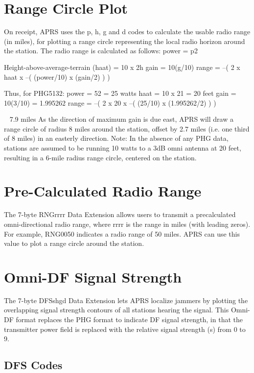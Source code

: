 \section{Range Circle Plot}

On receipt, APRS uses the p, h, g and d codes to calculate the usable radio
range (in miles), for plotting a range circle representing the local radio
horizon around the station. The radio range is calculated as follows:
power = p2

Height-above-average-terrain (haat) = 10 x 2h
gain = 10(g/10)
range = –( 2 x haat x –( (power/10) x (gain/2) ) )

Thus, for PHG5132:
power = 52 = 25 watts
haat = 10 x 21 = 20 feet
gain = 10(3/10) = 1.995262
range = –( 2 x 20 x –( (25/10) x (1.995262/2) ) )

~ 7.9 miles
As the direction of maximum gain is due east, APRS will draw a range circle
of radius 8 miles around the station, offset by 2.7 miles (i.e. one third of 8
miles) in an easterly direction.
Note: In the absence of any PHG data, stations are assumed to be running 10
watts to a 3dB omni antenna at 20 feet, resulting in a 6-mile radius range
circle, centered on the station.

\section {Pre-Calculated Radio Range}

The 7-byte RNGrrrr Data Extension allows users to transmit a precalculated omni-directional radio range, where rrrr is the range in miles
(with leading zeros).
For example, RNG0050 indicates a radio range of 50 miles.
APRS can use this value to plot a range circle around the station.

\section{Omni-DF Signal Strength}

The 7-byte DFSshgd Data Extension lets APRS localize jammers by plotting
the overlapping signal strength contours of all stations hearing the signal.
This Omni-DF format replaces the PHG format to indicate DF signal
strength, in that the transmitter power field is replaced with the relative
signal strength (s) from 0 to 9.


\subsection{DFS Codes}

